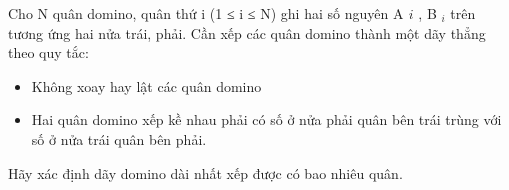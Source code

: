 Cho N quân domino, quân thứ i (1 ≤ i ≤ N) ghi hai số nguyên A $_ ­i $ , B $_ i $ trên tương ứng hai nửa trái, phải. Cần xếp các quân domino thành một dãy thẳng theo quy tắc:
\begin{itemize}
	\item Không xoay hay lật các quân domino
	\item Hai quân domino xếp kề nhau phải có số ở nửa phải quân bên trái trùng với số ở nửa trái quân bên phải.
\end{itemize}

Hãy xác định dãy domino dài nhất xếp được có bao nhiêu quân.